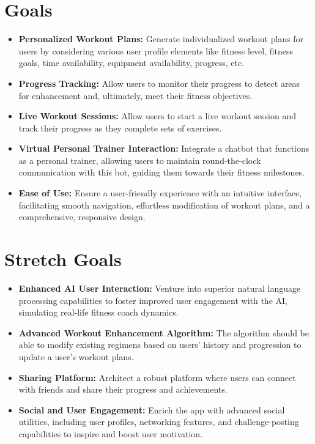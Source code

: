 \documentclass{article}
\begin{document}
    \section{Goals}

    \begin{itemize}
        \item \textbf{Personalized Workout Plans:} Generate individualized workout plans for users by considering various user profile elements like fitness level, fitness goals, time availability, equipment availability, progress, etc.
        \item \textbf{Progress Tracking:} Allow users to monitor their progress to detect areas for enhancement and, ultimately, meet their fitness objectives.
        \item \textbf{Live Workout Sessions:} Allow users to start a live workout session and track their progress as they complete sets of exercises. 
        \item \textbf{Virtual Personal Trainer Interaction:} Integrate a chatbot that functions as a personal trainer, allowing users to maintain round-the-clock communication with this bot, guiding them towards their fitness milestones.
        \item \textbf{Ease of Use:} Ensure a user-friendly experience with an intuitive interface, facilitating smooth navigation, effortless modification of workout plans, and a comprehensive, responsive design.
    \end{itemize}

    \section{Stretch Goals}

    \begin{itemize}
        \item \textbf{Enhanced AI User Interaction:} Venture into superior natural language processing capabilities to foster improved user engagement with the AI, simulating real-life fitness coach dynamics.
        \item \textbf{Advanced Workout Enhancement Algorithm:} The algorithm should be able to modify existing regimens based on users' history and progression to update a user's workout plans.
        \item \textbf{Sharing Platform:} Architect a robust platform where users can connect with friends and share their progress and achievements.
        \item \textbf{Social and User Engagement:} Enrich the app with advanced social utilities, including user profiles, networking features, and challenge-posting capabilities to inspire and boost user motivation.
    \end{itemize}
\end{document}
